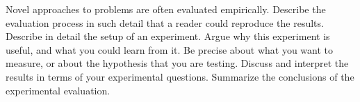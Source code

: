 Novel approaches to problems are often evaluated empirically. Describe the evaluation process in such detail that a reader could reproduce the results. Describe in detail the setup of an experiment. Argue why this experiment is useful, and what you could learn from it. Be precise about what you want to measure, or about the hypothesis that you are testing. Discuss and interpret the results in terms of your experimental questions. Summarize the conclusions of the experimental evaluation.